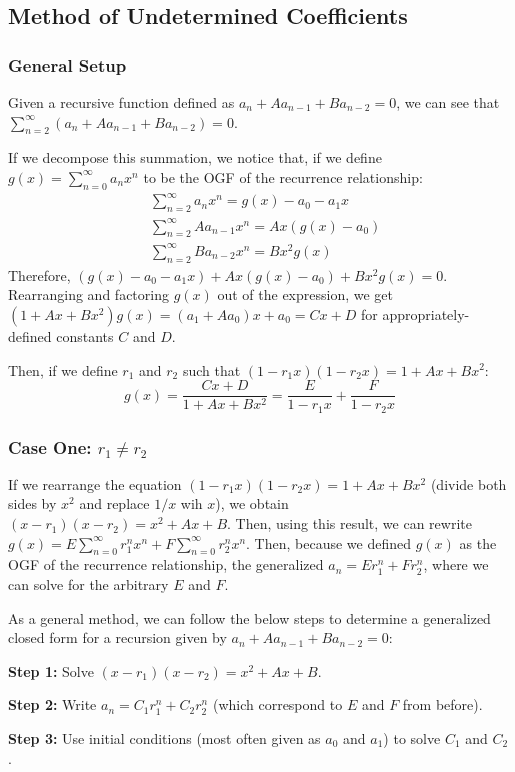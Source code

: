 \label{22-0325}

\subsection{Method of Undetermined Coefficients}
\subsubsection*{General Setup}
Given a recursive function defined as $a_n + A a_{n-1} + B a_{n-2} = 0$, 
we can see that $\sum_{n=2}^{\infty} (a_n + A a_{n-1} + B a_{n-2}) = 0$. 

If we decompose this summation, we notice that, if we define 
$g(x) = \sum_{n=0}^\infty a_n x^n$ to be the OGF of the recurrence relationship:
\begin{align*}
    &\sum_{n=2}^\infty a_n x^n = g(x) - a_0 - a_1 x \\ 
    &\sum_{n=2}^\infty A a_{n-1} x^n = Ax(g(x) - a_0) \\ 
    &\sum_{n=2}^\infty Ba_{n-2} x^n = Bx^2 g(x) 
\end{align*}
Therefore, $(g(x) - a_0 - a_1 x) + A x (g(x) - a_0) + B x^2 g(x) = 0$. 
Rearranging and factoring $g(x)$ out of the expression, we get 
$(1 + Ax + Bx^2) g(x) = (a_1 + Aa_0)x + a_0 = Cx + D$ for appropriately-
defined constants $C$ and $D$. 

Then, if we define $r_1$ and $r_2$ such that $(1 - r_1x)(1-r_2x) = 1 + Ax + Bx^2$:
\[
    g(x) = \frac{Cx + D}{1 + Ax + Bx^2} = \frac E {1-r_1x} + \frac F{1-r_2x}
\]
\subsubsection*{Case One: $r_1 \neq r_2$}
If we rearrange the equation $(1 - r_1x)(1 - r_2 x) = 1 + Ax + Bx^2$
(divide both sides by $x^2$ and replace $1/x$ wih $x$), we obtain 
$(x - r_1)(x-r_2) = x^2 + Ax + B$. Then, using this result, we can rewrite
$g(x) = E \sum_{n=0}^\infty r_1^n x^n + F \sum_{n=0}^\infty r_2^n x^n$. 
Then, because we defined $g(x)$ as the OGF of the recurrence relationship,
the generalized $a_n = E r_1^n + F r_2^n$, where we can solve for the arbitrary
$E$ and $F$. 

\begin{remark}
    As a general method, we can follow the below steps to determine a 
    generalized closed form for a recursion given by $a_n + Aa_{n-1} + Ba_{n-2} = 0$: 
    
    \qquad \textbf{Step 1:} Solve $(x - r_1) (x - r_2) = x^2 + Ax + B$. 
    
    \qquad \textbf{Step 2:} Write $a_n = C_1 r_1^n + C_2 r_2^n$ (which correspond
    to $E$ and $F$ from before). 
    
    \qquad \textbf{Step 3:} Use initial conditions (most often given as $a_0$ and $a_1$)
    to solve $C_1$ and $C_2$.
\end{remark}

